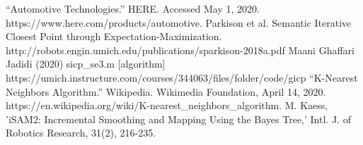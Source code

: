 \documentclass[letterpaper, 10 pt, conference]{ieeeconf}  %
\begin{document}
\addtolength{\textheight}{-12cm}   %





\begin{thebibliography}{99}

 “Automotive Technologies.” HERE. Accessed May 1, 2020. https://www.here.com/products/automotive.
 Parkison et al. Semantic Iterative Closest Point through Expectation-Maximization. http://robots.engin.umich.edu/publications/sparkison-2018a.pdf
 Maani Ghaffari Jadidi (2020) sicp\_se3.m [algorithm] https://umich.instructure.com/courses/344063/files/folder/code/gicp
 “K-Nearest Neighbors Algorithm.” Wikipedia. Wikimedia Foundation, April 14, 2020. https://en.wikipedia.org/wiki/K-nearest\_neighbors\_algorithm.
 M. Kaess, 'iSAM2: Incremental Smoothing and Mapping Using the Bayes Tree,' Intl. J. of Robotics Research, 31(2), 216-235.


\end{thebibliography}
\end{document}
